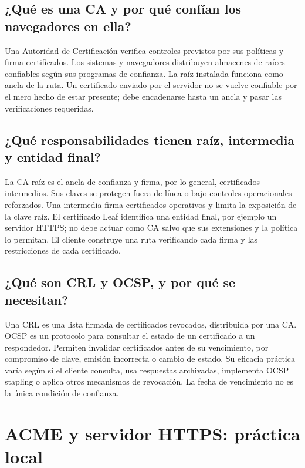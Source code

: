 \documentclass[11pt,a4paper]{article}
\begin{document}
\subsection{¿Qué es una CA y por qué confían los navegadores en ella?}
Una Autoridad de Certificación verifica controles previstos por sus políticas
y firma certificados. Los sistemas y navegadores distribuyen almacenes de
raíces confiables según sus programas de confianza. La raíz instalada funciona
como ancla de la ruta. Un certificado enviado por el servidor no se vuelve
confiable por el mero hecho de estar presente; debe encadenarse hasta un ancla
y pasar las verificaciones requeridas.

\subsection{¿Qué responsabilidades tienen raíz, intermedia y entidad final?}
La CA raíz es el ancla de confianza y firma, por lo general, certificados
intermedios. Sus claves se protegen fuera de línea o bajo controles
operacionales reforzados. Una intermedia firma certificados operativos y
limita la exposición de la clave raíz. El certificado Leaf identifica una
entidad final, por ejemplo un servidor HTTPS; no debe actuar como CA salvo que
sus extensiones y la política lo permitan. El cliente construye una ruta
verificando cada firma y las restricciones de cada certificado.

\subsection{¿Qué son CRL y OCSP, y por qué se necesitan?}
Una CRL es una lista firmada de certificados revocados, distribuida por una
CA. OCSP es un protocolo para consultar el estado de un certificado a un
respondedor. Permiten invalidar certificados antes de su vencimiento, por
compromiso de clave, emisión incorrecta o cambio de estado. Su eficacia
práctica varía según si el cliente consulta, usa respuestas archivadas,
implementa OCSP stapling o aplica otros mecanismos de revocación. La fecha de
vencimiento no es la única condición de confianza.

\section{ACME y servidor HTTPS: práctica local}
\end{document}
